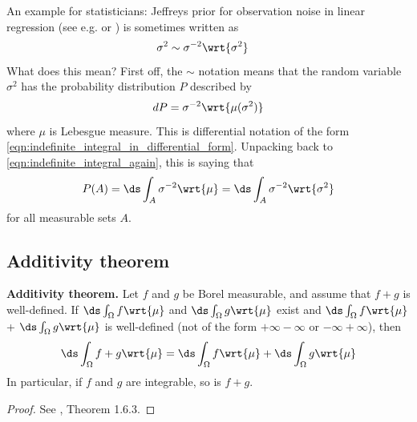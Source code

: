 \documentclass{article} %
\newcommand{\dint}{\ds\int}
\newcommand{\dmu}{\wrt{\mu}}
\begin{document}
\begin{example-for-statisticians}{}
An example for statisticians: Jeffreys prior for observation noise in linear regression  (see e.g. \cite{carvalho2010horseshoe} or \cite{makalic2015simple}) is sometimes written as
\begin{align}
 \sigma^2 &\sim \sigma^{-2} \wrt{\sigma^2} \label{eqn:prior_on_observation_noise_for_linear_regression_model_with_horseshoe_prior_jeffreys_special_case}
\end{align}
%
What does this mean?  First off, the $\sim$ notation means that the random variable $\sigma^2$ has the probability distribution $P$ described by
\[  dP = \sigma^{-2} \wrt{\mu(\sigma^2)} \]
where $\mu$ is Lebesgue measure. This is differential notation of the form \eqref{eqn:indefinite_integral_in_differential_form}.  Unpacking back to 	\eqref{eqn:indefinite_integral_again}, this is saying that
\[  P(A) = \ds\int_A \sigma^{-2} \dmu  = \ds\int_A \sigma^{-2} \wrt{\sigma^2} \]
for all measurable sets $A$.
\end{example-for-statisticians}

\subsection{Additivity theorem}
 
\begin{theorem}{\textbf{Additivity theorem.}}
Let $f$ and $g$ be Borel measurable, and assume that $f+g$ is well-defined.  If $\dint_\Omega f \dmu$ and $\dint_\Omega g \dmu$ exist and $\dint_\Omega f \dmu$ + $\dint_\Omega g \dmu$ is well-defined (not of the form $+ \infty - \infty$ or $- \infty +\infty$), then 
\[ \dint_\Omega f +g \dmu = \dint_\Omega f \dmu + \dint_\Omega g \dmu \]
In particular, if $f$ and $g$ are integrable, so is $f+g$.
\label{thm:additivity}
\end{theorem}

\begin{proof}
See \cite{ash2000probability}, Theorem 1.6.3.	
\end{proof}
\end{document}
